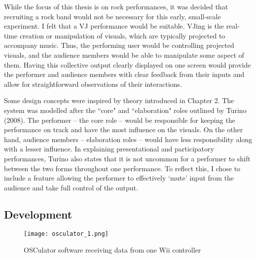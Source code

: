 While the focus of this thesis is on rock performances, it was decided that recruiting a rock band would not be necessary for this early, small-scale experiment. I felt that a VJ performance would be suitable. VJing is the real-time creation or manipulation of visuals, which are typically projected to accompany music. Thus, the performing user would be controlling projected visuals, and the audience members would be able to manipulate some aspect of them. Having this collective output clearly displayed on one screen would provide the performer and audience members with clear feedback from their inputs and allow for straightforward observations of their interactions.

Some design concepts were inspired by theory introduced in Chapter 2. The system was modelled after the ``core" and ``elaboration" roles outlined by Turino (2008). The performer -- the core role -- would be responsible for keeping the performance on track and have the most influence on the visuals. On the other hand, audience members -- elaboration roles -- would have less responsibility along with a lesser influence. In explaining presentational and participatory performances, Turino also states that it is not uncommon for a performer to shift between the two forms throughout one performance. To reflect this, I chose to include a feature allowing the performer to effectively `mute' input from the audience and take full control of the output.

\subsection{Development}

\begin{figure}
	\centering

	\texttt{[image: osculator\_1.png]}
	\caption{OSCulator software receiving data from one Wii controller}

	\label{prototyping1.1}
\end{figure}

